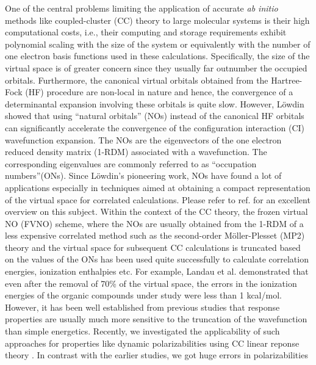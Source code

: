 One of the central problems limiting the application of accurate {\em ab
initio} methods like coupled-cluster (CC) theory to large molecular systems is their high 
computational costs, i.e., their computing and storage requirements 
exhibit polynomial scaling with the size of the system or equivalently
with the number of one electron basis functions used in these calculations.
Specifically, the size of the virtual space is of greater concern since  
they usually far outnumber the occupied orbitals. Furthermore, the canonical virtual orbitals
obtained from the Hartree-Fock (HF) procedure are non-local in nature and hence, 
the convergence of a determinantal expansion involving these orbitals
is quite slow. However, L{\"o}wdin \cite{Lowdin55}showed that using 
``natural orbitals'' (NOs) instead of the canonical HF orbitals can significantly 
accelerate the convergence of the configuration interaction (CI)
wavefunction expansion. The NOs are the eigenvectors of the 
one electron reduced density matrix (1-RDM) associated with a wavefunction. 
The corresponding eigenvalues are commonly referred to 
as ``occupation numbers''(ONs). Since L{\"o}wdin's pioneering 
work, NOs have found a lot of applications especially in techniques 
aimed at obtaining a compact representation of the virtual space for 
correlated calculations.\cite{Sosa89,Taube05,Taube08,Landau10,DePrince13:FNOs,DePrince13} 
Please refer to ref.\cite{Landau10} for an excellent overview on this subject. 
Within the context of the CC theory, the frozen virtual NO (FVNO) scheme, where 
the NOs are usually obtained from the 1-RDM of a less expensive correlated method 
such as the second-order M{\"o}ller-Plesset (MP2) theory and the virtual space for subsequent 
CC calculations is truncated based on the values of the ONs has been used quite 
successfully to calculate correlation energies, 
ionization enthalpies etc. For example, Landau et al.\cite{Landau10} demonstrated 
that even after the removal of 70\% of the virtual space, the errors in
the ionization energies of the organic compounds under study were less than 1 kcal/mol.
However, it has been well established from previous studies that response 
properties are usually much more sensitive to the truncation of the wavefunction 
than simple energetics\cite{Korona04,Russ04,Russ08,McAlexander12,Friedrich15,McAlexander15:LRCC}. 
Recently, we investigated the applicability of such 
approaches for properties like dynamic polarizabilities using CC linear reponse theory
\cite{Koch90}. In contrast with the earlier studies\cite{Kumar17}, we got huge errors in polarizabilities 
